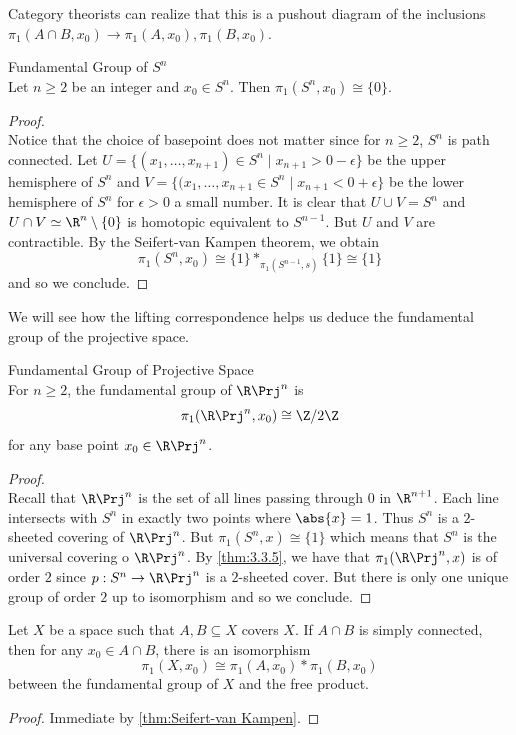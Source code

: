 \documentclass[a4paper]{article}
\begin{document}
Category theorists can realize that this is a pushout diagram of the inclusions $\pi_1(A\cap B,x_0)\to\pi_1(A,x_0),\pi_1(B,x_0)$. 

\begin{eg}{Fundamental Group of $S^n$}{}\\
Let $n\geq 2$ be an integer and $x_0\in S^n$. Then $\pi_1(S^n,x_0)\cong\{0\}$. 
\begin{proof}\\
Notice that the choice of basepoint does not matter since for $n\geq 2$, $S^n$ is path connected. Let $U=\{(x_1,\dots,x_{n+1})\in S^n\;|\;x_{n+1}>0-\epsilon\}$ be the upper hemisphere of $S^n$ and $V=\{(x_1,\dots,x_{n+1}\in S^n\;|\; x_{n+1}<0+\epsilon\}$ be the lower hemisphere of $S^n$ for $\epsilon>0$ a small number. It is clear that $U\cup V=S^n$ and $U\cap V\simeq\R^n\setminus\{0\}$ is homotopic equivalent to $S^{n-1}$. But $U$ and $V$ are contractible. By the Seifert-van Kampen theorem, we obtain $$\pi_1(S^n,x_0)\cong\{1\}\ast_{\pi_1(S^{n-1},s)}\{1\}\cong\{1\}$$ and so we conclude. 
\end{proof}
\end{eg}

We will see how the lifting correspondence helps us deduce the fundamental group of the projective space. 

\begin{eg}{Fundamental Group of Projective Space}{}\\
For $n\geq 2$, the fundamental group of $\R\Prj^n$ is $$\pi_1(\R\Prj^n,x_0)\cong\Z/2\Z$$ for any base point $x_0\in\R\Prj^n$. 
\begin{proof}\\
Recall that $\R\Prj^n$ is the set of all lines passing through $0$ in $\R^{n+1}$. Each line intersects with $S^n$ in exactly two points where $\abs{x}=1$. Thus $S^n$ is a $2$-sheeted covering of $\R\Prj^n$. But $\pi_1(S^n,x)\cong\{1\}$ which means that $S^n$ is the universal covering o $\R\Prj^n$. By \ref{thm:3.3.5}, we have that $\pi_1(\R\Prj^n,x)$ is of order $2$ since $p:S^n\to\R\Prj^n$ is a $2$-sheeted cover. But there is only one unique group of order $2$ up to isomorphism and so we conclude. 
\end{proof}
\end{eg}

\begin{crl}{}{} Let $X$ be a space such that $A,B\subseteq X$ covers $X$. If $A\cap B$ is simply connected, then for any $x_0\in A\cap B$, there is an isomorphism $$\pi_1(X,x_0)\cong\pi_1(A,x_0)\ast\pi_1(B,x_0)$$ between the fundamental group of $X$ and the free product. 
\begin{proof}
Immediate by \ref{thm:Seifert-van Kampen}. 
\end{proof}
\end{crl}
\end{document}
